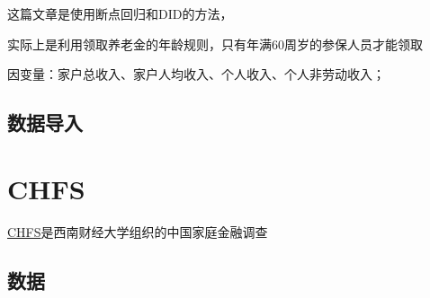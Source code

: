\documentclass[
  oneside]{book}
\begin{document}
这篇文章是使用断点回归和DID的方法，

实际上是利用领取养老金的年龄规则，只有年满60周岁的参保人员才能领取

因变量：家户总收入、家户人均收入、个人收入、个人非劳动收入；

\hypertarget{ux6570ux636eux5bfcux5165-1}{%
\section{数据导入}\label{ux6570ux636eux5bfcux5165-1}}

\hypertarget{chfs}{%
\chapter{CHFS}\label{chfs}}

\href{https://chfs.swufe.edu.cn/}{CHFS}是西南财经大学组织的中国家庭金融调查

\hypertarget{ux6570ux636e}{%
\section{数据}\label{ux6570ux636e}}

\printbibliography
\end{document}
